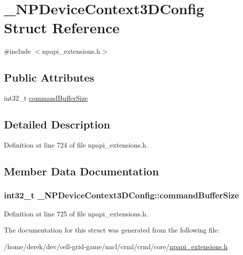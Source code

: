 \hypertarget{struct___n_p_device_context3_d_config}{
\section{\_\-NPDeviceContext3DConfig Struct Reference}
\label{struct___n_p_device_context3_d_config}
}


{\ttfamily \#include $<$npapi\_\-extensions.h$>$}

\subsection*{Public Attributes}
\begin{DoxyCompactItemize}
\item 
int32\_\-t \hyperlink{struct___n_p_device_context3_d_config_a0075edbd3e0c70d8db09dc0270c9bc76}{commandBufferSize}
\end{DoxyCompactItemize}


\subsection{Detailed Description}


Definition at line 724 of file npapi\_\-extensions.h.



\subsection{Member Data Documentation}
\hypertarget{struct___n_p_device_context3_d_config_a0075edbd3e0c70d8db09dc0270c9bc76}{
\subsubsection[{commandBufferSize}]{\setlength{\rightskip}{0pt plus 5cm}int32\_\-t {\bf \_\-NPDeviceContext3DConfig::commandBufferSize}}}
\label{struct___n_p_device_context3_d_config_a0075edbd3e0c70d8db09dc0270c9bc76}


Definition at line 725 of file npapi\_\-extensions.h.



The documentation for this struct was generated from the following file:\begin{DoxyCompactItemize}
\item 
/home/derek/dev/cell-\/grid-\/game/nacl/crml/crml/core/\hyperlink{npapi__extensions_8h}{npapi\_\-extensions.h}\end{DoxyCompactItemize}

